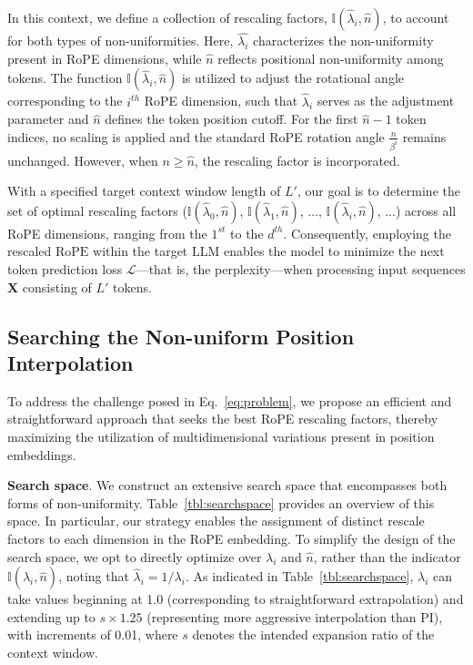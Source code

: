 In this context, we define a collection of rescaling factors, $\mathbb{I}(\hat{\lambda}_{i},\hat{n})$, to account for both types of non-uniformities. Here, $\hat{\lambda_i}$ characterizes the non-uniformity present in RoPE dimensions, while $\hat{n}$ reflects positional non-uniformity among tokens. The function $\mathbb{I}(\hat{\lambda}_{i},\hat{n})$ is utilized to adjust the rotational angle corresponding to the $i^{th}$ RoPE dimension, such that $\hat\lambda_{i}$ serves as the adjustment parameter and $\hat{n}$ defines the token position cutoff. For the first $\hat{n}-1$ token indices, no scaling is applied and the standard RoPE rotation angle $\frac{n}{\beta^i}$ remains unchanged. However, when $n\ge\hat{n}$, the rescaling factor is incorporated.

With a specified target context window length of $L'$, our goal is to determine the set of optimal rescaling factors ($\mathbb{I}(\hat{\lambda}_{0},\hat{n})$, $\mathbb{I}(\hat{\lambda}_{1},\hat{n})$, ..., $\mathbb{I}(\hat{\lambda}_{i},\hat{n})$, ...) across all RoPE dimensions, ranging from the $1^{st}$ to the $d^{th}$. Consequently, employing the rescaled $\text{RoPE}$ within the target $\text{LLM}$ enables the model to minimize the next token prediction loss $\mathcal{L}$—that is, the perplexity—when processing input sequences $\mathbf{X}$ consisting of $L'$ tokens.

\subsection{Searching the Non-uniform Position Interpolation}

To address the challenge posed in Eq.~\ref{eq:problem}, we propose an efficient and straightforward approach that seeks the best RoPE rescaling factors, thereby maximizing the utilization of multidimensional variations present in position embeddings.

\textbf{Search space}. We construct an extensive search space that encompasses both forms of non-uniformity. Table~\ref{tbl:searchspace} provides an overview of this space. In particular, our strategy enables the assignment of distinct rescale factors to each dimension in the RoPE embedding. To simplify the design of the search space, we opt to directly optimize over $\lambda_i$ and $\hat{n}$, rather than the indicator $\mathbb{I}(\hat{\lambda}_{i},\hat{n})$, noting that $\hat{\lambda}_{i}=1/\lambda_i$. As indicated in Table~\ref{tbl:searchspace}, $\lambda_i$ can take values beginning at 1.0 (corresponding to straightforward extrapolation) and extending up to $s\times1.25$ (representing more aggressive interpolation than PI), with increments of 0.01, where $s$ denotes the intended expansion ratio of the context window.

